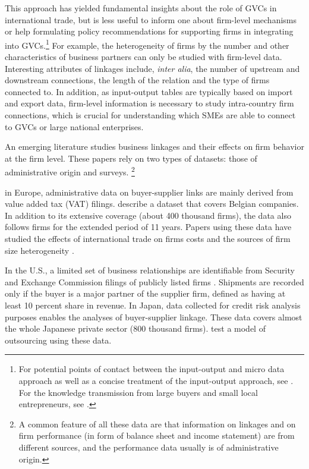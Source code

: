\usepackage{}\documentclass[final, dvipsnames, authoryear,12pt]{elsarticle}
\begin{document}
This approach has yielded fundamental insights about the role of GVCs in international trade, but is less useful to inform one about firm-level mechanisms or help formulating policy recommendations for supporting firms in integrating into GVCs.\footnote{For potential points of contact between the input-output and micro data approach as well as a concise treatment of the input-output approach, see \cite{johnson2018measuring}. For the knowledge transmission from large buyers and small local entrepreneurs, see \citep{schmitz2000learning}.} For example, the heterogeneity of firms by the number and other characteristics of business partners can only be studied with firm-level data. Interesting attributes of linkages include, \textit{inter alia}, the number of upstream and downstream connections, the length of the relation and the type of firms connected to. In addition, as input-output tables are typically based on import and export data, firm-level information is necessary to study intra-country firm connections, which is crucial for understanding which SMEs are able to connect to GVCs or large national enterprises.

An emerging literature studies business linkages and their effects on firm behavior at the firm level. These papers rely on two types of datasets: those of administrative origin and surveys. \footnote{A common feature of all these data are that information on linkages and on firm performance (in form of balance sheet and income statement) are from different sources, and the performance data usually is of administrative origin.} 

in Europe, administrative data on buyer-supplier links are mainly derived from value added tax (VAT) filings. \cite{dhyne2015belgian} describe a dataset that covers Belgian companies. In addition to its extensive coverage (about 400 thousand firms), the data also follows firms for the extended period of 11 years. Papers using these data have studied the effects of international trade on firms costs \citep{tintelnot2018trade} and the sources of firm size heterogeneity \citep{bernard2019production}. 

In the U.S., a limited set of business relationships are identifiable from Security and Exchange Commission filings of publicly listed firms \citep{Barrot2016-wc}. Shipments are recorded only if the buyer is a major partner of the supplier firm, defined as having at least 10 percent share in revenue. In Japan, data collected for credit risk analysis purposes enables the analyses of buyer-supplier linkage. These data covers almost the whole Japanese private sector (800 thousand firms). \cite{bernard2019production} test a model of outsourcing using these data. 
\end{document}

